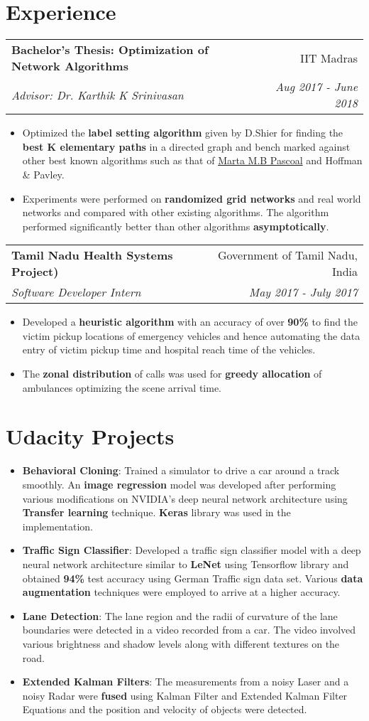 \documentclass[letterpaper,11pt]{article}
\makeatletter
\newcommand{\resumeItem}[2]{
  \item\small{
    \textbf{#1}{: #2 \vspace{-2pt}}
  }
}
\newcommand{\ritem}[1]{
  \item\small{
    {#1 \vspace{-2pt}}
  }
}
\newcommand{\resumeSubheading}[4]{
  \vspace{-1pt}\item
    \begin{tabular*}{0.97\textwidth}{l@{\extracolsep{\fill}}r}
      \textbf{#1} & #2 \\
      \textit{#3} & \textit{#4} \\
    \end{tabular*}\vspace{-5pt}
}
\newcommand{\resumeSubItem}[2]{\resumeItem{#1}{#2}\vspace{-4pt}}
\newcommand{\resumeSubHeadingListStart}{\begin{description}[leftmargin=*]}
\newcommand{\resumeSubHeadingListEnd}{\end{description}\vspace{-6pt}}
\newcommand{\resumeItemListStart}{\begin{itemize}[leftmargin=*]}
\newcommand{\resumeItemListEnd}{\end{itemize}\vspace{-4pt}}
\makeatother
\begin{document}
\section{Experience}
  \resumeSubHeadingListStart
    \resumeSubheading
      {Bachelor’s Thesis: Optimization of Network Algorithms}{IIT Madras}
      {Advisor: Dr. Karthik K Srinivasan}{Aug 2017 - June 2018}
      \resumeItemListStart
        \justifying\ritem{Optimized the \textbf{label setting algorithm} given by D.Shier for finding the \textbf{best K elementary paths} in a directed graph and bench marked against other best known algorithms such as that of \href{http://www.dis.uniroma1.it/challenge9/papers/pascoal.pdf}{Marta M.B Pascoal} and Hoffman \& Pavley.}
        \ritem{Experiments were performed on \textbf{randomized grid networks} and real world networks and compared with other existing algorithms. The algorithm performed significantly better than other algorithms \textbf{asymptotically}.}
      \resumeItemListEnd
      
    \resumeSubheading
      {Tamil Nadu Health Systems Project)}{Government of Tamil Nadu, India}
      {Software Developer Intern}{May 2017 - July 2017}
      \resumeItemListStart
        \ritem
          {Developed a \textbf{heuristic algorithm} with an accuracy of over \textbf{90\%} to find the victim pickup locations of emergency vehicles and hence automating the data entry of victim pickup time and hospital reach time of the vehicles.}
        \ritem
          {The \textbf{zonal distribution} of calls was used for \textbf{greedy allocation} of ambulances optimizing the scene arrival time.}
      \resumeItemListEnd

  \resumeSubHeadingListEnd

\section{Udacity Projects}
  \resumeItemListStart
    \justifying\resumeSubItem{Behavioral Cloning}
      {Trained a simulator to drive a car around a track smoothly. An \textbf{image regression} model was developed after performing various modifications on NVIDIA's deep neural network architecture using \textbf{Transfer learning} technique. \textbf{Keras} library was used in the implementation.}
    \justifying\resumeSubItem{Traffic Sign Classifier}
      {Developed a traffic sign classifier model with a deep neural network architecture similar to \textbf{LeNet} using Tensorflow library and obtained \textbf{94\%} test accuracy using German Traffic sign data set. Various \textbf{data augmentation} techniques were employed to arrive at a higher accuracy.}
    \justifying\resumeSubItem{Lane Detection}
      {The lane region and the radii of curvature of the lane boundaries were detected in a video recorded from a car. The video involved various brightness and shadow levels along with different textures on the road.}
    \justifying\resumeSubItem{Extended Kalman Filters}
      {The measurements from a noisy Laser and a noisy Radar were \textbf{fused} using Kalman Filter and Extended Kalman Filter Equations and the position and velocity of objects were detected.}
  \resumeItemListEnd
\end{document}
